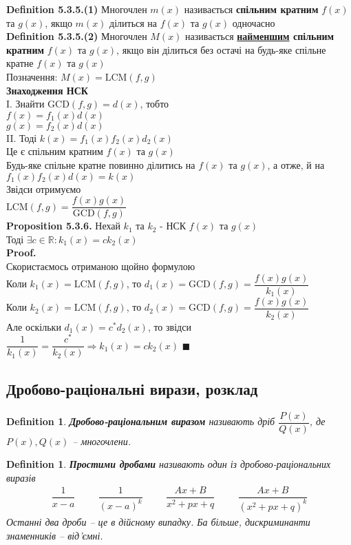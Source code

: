 \documentclass[a4paper, 10pt]{extarticle}
\def\defin#1{\textbf{Definition {#1}}}
\def\prp#1{\textbf{Proposition {#1}}}
\def\proof{\textbf{Proof.}\\}
\def\bigline{\vspace{5mm}\\}
\def\qed{$\blacksquare$}
\def\qed{$\blacksquare$}
\theoremstyle{theoremdd}
\theoremstyle{theoremdd}
\newtheorem{definition}[theorem]{Definition}
\theoremstyle{theoremdd}
\theoremstyle{theoremdd}
\theoremstyle{theoremdd}
\theoremstyle{theoremdd}
\theoremstyle{theoremdd}
\theoremstyle{theoremdd}
\begin{document}
\defin{5.3.5.(1)} Многочлен $m(x)$ називається \textbf{спільним кратним} $f(x)$ та $g(x)$, якщо $m(x)$ ділиться на $f(x)$ та $g(x)$ одночасно
\bigline
\defin{5.3.5.(2)} Многочлен $M(x)$ називається \textbf{\underline{найменшим} спільним кратним} $f(x)$ та $g(x)$, якщо він ділиться без остачі на будь-яке спільне кратне $f(x)$ та $g(x)$\\
Позначення: $M(x) = \textrm{LCM}(f,g)$
\bigline
\textbf{Знаходження НСК}\\
I. Знайти $\textrm{GCD}(f,g) = d(x)$, тобто\\
$f(x) = f_1(x) d(x)$\\
$g(x) = f_2(x) d(x)$\\
II. Тоді $k(x) = f_1(x)f_2(x)d_2(x)$\\
Це є спільним кратним $f(x)$ та $g(x)$\\
Будь-яке спільне кратне повинно ділитись на $f(x)$ та $g(x)$, а отже, й на $f_1(x)f_2(x)d(x) = k(x)$\\
Звідси отримуємо\\
$\textrm{LCM}(f,g) = \dfrac{f(x)g(x)}{\textrm{GCD}(f,g)}$
\bigline
\prp{5.3.6.} Нехай $k_1$ та $k_2$ - НСК $f(x)$ та $g(x)$\\
Тоді $\exists c \in \mathbb{R}: k_1(x) = ck_2(x)$\\
\proof
Скористаємось отриманою щойно формулою\\
Коли $k_1(x) = \textrm{LCM}(f,g)$, то $d_1(x) = \textrm{GCD}(f,g) = \dfrac{f(x)g(x)}{k_1(x)}$\\
Коли $k_2(x) = \textrm{LCM}(f,g)$, то $d_2(x) = \textrm{GCD}(f,g) = \dfrac{f(x)g(x)}{k_2(x)}$\\
Але оскільки $d_1(x) = c^*d_2(x)$, то звідси $\dfrac{1}{k_1(x)} = \dfrac{c^*}{k_2(x)} \Rightarrow k_1(x) = c k_2(x)$ \qed
\bigline
\fi

\subsection{Дробово-раціональні вирази, розклад}
\begin{definition}
\textbf{Дробово-раціональним виразом} називають дріб $\dfrac{P(x)}{Q(x)}$, де $P(x),Q(x)$ -- многочлени.
\end{definition}

\begin{definition}
\textbf{Простими дробами} називають один із дробово-раціональних виразів
\begin{align*}
\dfrac{1}{x-a} \hspace{1cm} \dfrac{1}{(x-a)^k} \hspace{1cm} \dfrac{Ax+B}{x^2+px+q} \hspace{1cm} \dfrac{Ax+B}{(x^2+px+q)^k}
\end{align*}
Останні два дроби -- це в дійсному випадку. Ба більше, дискриминанти знаменників -- від'ємні.
\end{definition}
\end{document}
